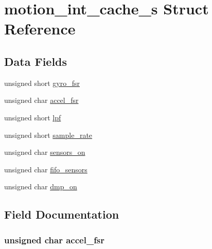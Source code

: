 \hypertarget{structmotion__int__cache__s}{}\section{motion\+\_\+int\+\_\+cache\+\_\+s Struct Reference}
\label{structmotion__int__cache__s}
\subsection*{Data Fields}
\begin{DoxyCompactItemize}
\item 
unsigned short \hyperlink{structmotion__int__cache__s_a6424d033f39042e9e1105c14f6fa89d7}{gyro\+\_\+fsr}
\item 
unsigned char \hyperlink{structmotion__int__cache__s_a97d5de8aa2fab5cc81ca2180130fc6ac}{accel\+\_\+fsr}
\item 
unsigned short \hyperlink{structmotion__int__cache__s_a0ba1d4e0bb375eb3050352ddef12d25f}{lpf}
\item 
unsigned short \hyperlink{structmotion__int__cache__s_a1aa4e026c4d2f691506f2d713a405aea}{sample\+\_\+rate}
\item 
unsigned char \hyperlink{structmotion__int__cache__s_a90574f8e8515ef8fee3114ba7e0ddc5c}{sensors\+\_\+on}
\item 
unsigned char \hyperlink{structmotion__int__cache__s_ae3cc01b3471d10bd06f81fbf628f3e19}{fifo\+\_\+sensors}
\item 
unsigned char \hyperlink{structmotion__int__cache__s_a49fb51079238683b21264827348b5968}{dmp\+\_\+on}
\end{DoxyCompactItemize}


\subsection{Field Documentation}
\subsubsection[{\texorpdfstring{accel\+\_\+fsr}{accel_fsr}}]{\setlength{\rightskip}{0pt plus 5cm}unsigned char accel\+\_\+fsr}\hypertarget{structmotion__int__cache__s_a97d5de8aa2fab5cc81ca2180130fc6ac}{}\label{structmotion__int__cache__s_a97d5de8aa2fab5cc81ca2180130fc6ac}
